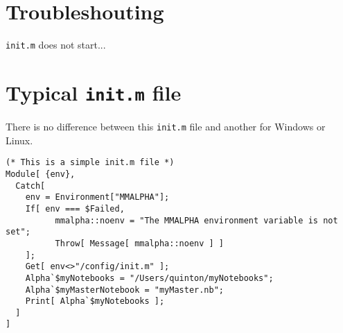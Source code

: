 \documentclass[11pt]{article}
\begin{document}
\section{Troubleshouting}
\texttt{init.m} does not start...

\appendix{}
\label{init}
\section{Typical \texttt{init.m} file}
There is no difference between this \texttt{init.m} file and 
another for Windows or Linux.
\begin{verbatim}
(* This is a simple init.m file *)
Module[ {env},
  Catch[
    env = Environment["MMALPHA"];
    If[ env === $Failed, 
          mmalpha::noenv = "The MMALPHA environment variable is not set";
          Throw[ Message[ mmalpha::noenv ] ]
    ];
    Get[ env<>"/config/init.m" ];
    Alpha`$myNotebooks = "/Users/quinton/myNotebooks";
    Alpha`$myMasterNotebook = "myMaster.nb";
    Print[ Alpha`$myNotebooks ];
  ]
]
\end{verbatim}
\end{document}
